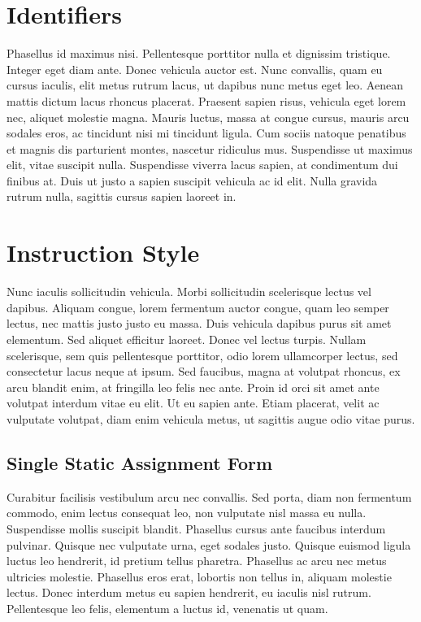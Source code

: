 \section{Identifiers}
Phasellus id maximus nisi. Pellentesque porttitor nulla et dignissim tristique. Integer eget diam ante. Donec vehicula auctor est. Nunc convallis, quam eu cursus iaculis, elit metus rutrum lacus, ut dapibus nunc metus eget leo. Aenean mattis dictum lacus rhoncus placerat. Praesent sapien risus, vehicula eget lorem nec, aliquet molestie magna. Mauris luctus, massa at congue cursus, mauris arcu sodales eros, ac tincidunt nisi mi tincidunt ligula. Cum sociis natoque penatibus et magnis dis parturient montes, nascetur ridiculus mus. Suspendisse ut maximus elit, vitae suscipit nulla. Suspendisse viverra lacus sapien, at condimentum dui finibus at. Duis ut justo a sapien suscipit vehicula ac id elit. Nulla gravida rutrum nulla, sagittis cursus sapien laoreet in.


\section{Instruction Style}
Nunc iaculis sollicitudin vehicula. Morbi sollicitudin scelerisque lectus vel dapibus. Aliquam congue, lorem fermentum auctor congue, quam leo semper lectus, nec mattis justo justo eu massa. Duis vehicula dapibus purus sit amet elementum. Sed aliquet efficitur laoreet. Donec vel lectus turpis. Nullam scelerisque, sem quis pellentesque porttitor, odio lorem ullamcorper lectus, sed consectetur lacus neque at ipsum. Sed faucibus, magna at volutpat rhoncus, ex arcu blandit enim, at fringilla leo felis nec ante. Proin id orci sit amet ante volutpat interdum vitae eu elit. Ut eu sapien ante. Etiam placerat, velit ac vulputate volutpat, diam enim vehicula metus, ut sagittis augue odio vitae purus.

\subsection{Single Static Assignment Form}
Curabitur facilisis vestibulum arcu nec convallis. Sed porta, diam non fermentum commodo, enim lectus consequat leo, non vulputate nisl massa eu nulla. Suspendisse mollis suscipit blandit. Phasellus cursus ante faucibus interdum pulvinar. Quisque nec vulputate urna, eget sodales justo. Quisque euismod ligula luctus leo hendrerit, id pretium tellus pharetra. Phasellus ac arcu nec metus ultricies molestie. Phasellus eros erat, lobortis non tellus in, aliquam molestie lectus. Donec interdum metus eu sapien hendrerit, eu iaculis nisl rutrum. Pellentesque leo felis, elementum a luctus id, venenatis ut quam.


